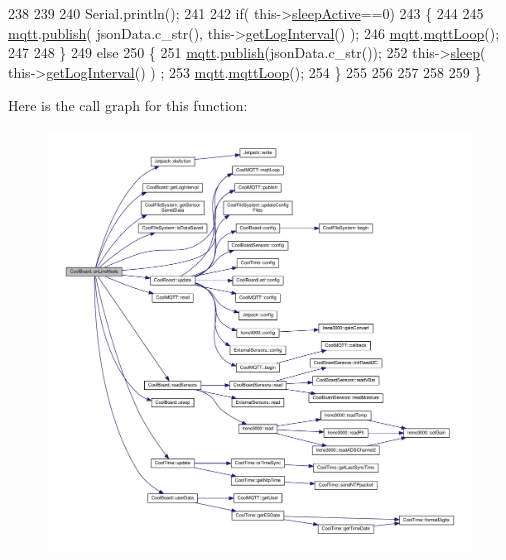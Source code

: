 \begin{DoxyCode}
238 
239     
240     Serial.println();
241     
242     \textcolor{keywordflow}{if}( this->\hyperlink{classCoolBoard_a0a51b2287139f66c738101fb53139230}{sleepActive}==0)    
243     \{   
244         
245         \hyperlink{classCoolBoard_a2399f44d7c23c1149a335cb3b46d90f1}{mqtt}.\hyperlink{classCoolMQTT_ace977b3e90ab14b1199fe5c4fb0a13ec}{publish}( jsonData.c\_str(), this->\hyperlink{classCoolBoard_aaa24480b273fc095a1356a589c333781}{getLogInterval}() );
246         \hyperlink{classCoolBoard_a2399f44d7c23c1149a335cb3b46d90f1}{mqtt}.\hyperlink{classCoolMQTT_aa5eaae967b562b62cbcf2b8d81f6e5d5}{mqttLoop}();
247     
248     \}
249     \textcolor{keywordflow}{else}
250     \{
251         \hyperlink{classCoolBoard_a2399f44d7c23c1149a335cb3b46d90f1}{mqtt}.\hyperlink{classCoolMQTT_ace977b3e90ab14b1199fe5c4fb0a13ec}{publish}(jsonData.c\_str());      
252         this->\hyperlink{classCoolBoard_a5d0c8ff93b615efd676be432de9f164a}{sleep}( this->\hyperlink{classCoolBoard_aaa24480b273fc095a1356a589c333781}{getLogInterval}() ) ;
253         \hyperlink{classCoolBoard_a2399f44d7c23c1149a335cb3b46d90f1}{mqtt}.\hyperlink{classCoolMQTT_aa5eaae967b562b62cbcf2b8d81f6e5d5}{mqttLoop}();
254     \}
255 
256     
257         
258         
259 \}
\end{DoxyCode}
Here is the call graph for this function\+:
\nopagebreak
\begin{figure}[H]
\begin{center}
\leavevmode
\includegraphics[width=350pt]{classCoolBoard_aa0bbc4bc605e35618d18e68795c61363_cgraph}
\end{center}
\end{figure}
\mbox{\label{classCoolBoard_a486507b8f0981d3cc671ed31c2145755}} 
